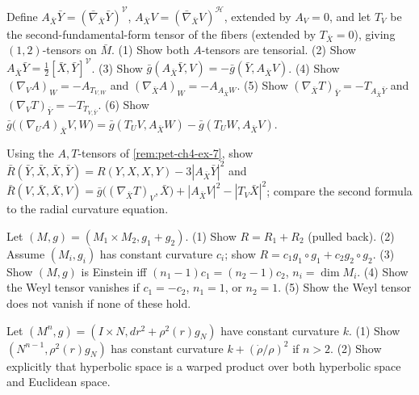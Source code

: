 \begin{remark}
  \label{rem:pet-ch4-ex-7}
  Define $A_{\bar X}\bar Y=(\bar\nabla_{\bar X}\bar Y)^{\mathcal V}$,
  $A_{\bar X}V=(\bar\nabla_{\bar X}V)^{\mathcal H}$, extended by $A_V=0$, and let
  $T_V$ be the second-fundamental-form tensor of the fibers (extended by
  $T_{\bar X}=0$), giving $(1,2)$-tensors on $\bar M$. (1) Show both
  $A$-tensors are tensorial. (2) Show
  $A_{\bar X}\bar Y=\tfrac12[\bar X,\bar Y]^{\mathcal V}$. (3) Show
  $\bar g(A_{\bar X}\bar Y,V)=-\bar g(\bar Y,A_{\bar X}V)$. (4) Show
  $(\nabla_VA)_W=-A_{T_{V,W}}$ and $(\nabla_{\bar X}A)_W=-A_{A_{\bar X}W}$.
  (5) Show $(\nabla_{\bar X}T)_{\bar Y}=-T_{A_{\bar X}\bar Y}$ and
  $(\nabla_VT)_{\bar Y}=-T_{T_{V,\bar Y}}$. (6) Show
  $\bar g\big((\nabla_UA)_{\bar X}V,W\big)=\bar g(T_UV,A_{\bar X}W)-\bar g(T_UW,A_{\bar X}V)$.
\end{remark}

\begin{remark}
  \label{rem:pet-ch4-ex-8}
  Using the $A,T$-tensors of \cref{rem:pet-ch4-ex-7}, show
  $\bar R(\bar Y,\bar X,\bar X,\bar Y)=R(Y,X,X,Y)-3|A_{\bar X}\bar Y|^2$ and
  $\bar R(V,\bar X,\bar X,V)=\bar g\big((\nabla_{\bar X}T)_V,\bar X\big)+|A_{\bar X}V|^2-|T_V\bar X|^2$;
  compare the second formula to the radial curvature equation.
\end{remark}

\begin{remark}
  \label{rem:pet-ch4-ex-9}
  Let $(M,g)=(M_1\times M_2,g_1+g_2)$. (1) Show $R=R_1+R_2$ (pulled back). (2)
  Assume $(M_i,g_i)$ has constant curvature $c_i$; show $R=c_1g_1\circ g_1+c_2g_2\circ g_2$.
  (3) Show $(M,g)$ is Einstein iff $(n_1-1)c_1=(n_2-1)c_2$, $n_i=\dim M_i$. (4)
  Show the Weyl tensor vanishes if $c_1=-c_2$, $n_1=1$, or $n_2=1$. (5) Show
  the Weyl tensor does not vanish if none of these hold.
\end{remark}

\begin{remark}
  \label{rem:pet-ch4-ex-10}
  Let $(M^n,g)=(I\times N,dr^2+\rho^2(r)g_N)$ have constant curvature $k$. (1)
  Show $(N^{n-1},\rho^2(r)g_N)$ has constant curvature $k+(\dot\rho/\rho)^2$ if
  $n>2$. (2) Show explicitly that hyperbolic space is a warped product over
  both hyperbolic space and Euclidean space.
\end{remark}

